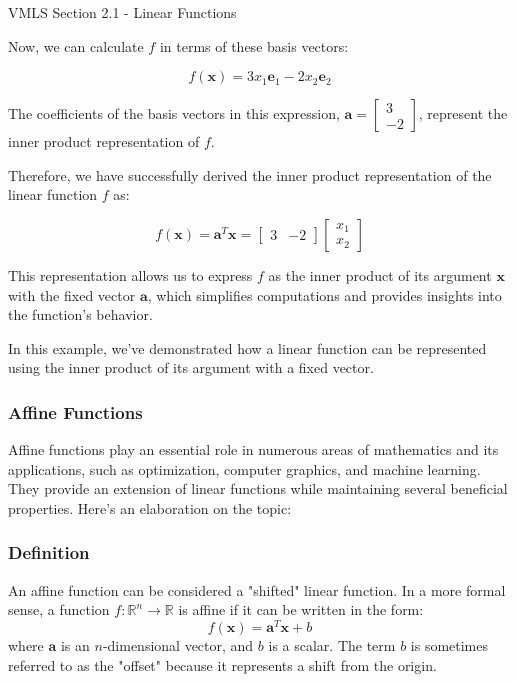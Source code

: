 \begin{notes}{VMLS Section 2.1 - Linear Functions}
\begin{highlight}
        Now, we can calculate \(f\) in terms of these basis vectors:
        
        \[
        f(\mathbf{x}) = 3x_1\mathbf{e}_1 - 2x_2\mathbf{e}_2
        \]
        
        The coefficients of the basis vectors in this expression, \(\mathbf{a} = \begin{bmatrix} 3 \\ -2 \end{bmatrix}\), represent the inner product representation of \(f\).
        
        Therefore, we have successfully derived the inner product representation of the linear function \(f\) as:
        
        \[
        f(\mathbf{x}) = \mathbf{a}^T \mathbf{x} = \begin{bmatrix} 3 & -2 \end{bmatrix} \begin{bmatrix} x_1 \\ x_2 \end{bmatrix}
        \]

        
        This representation allows us to express \(f\) as the inner product of its argument \(\mathbf{x}\) with the fixed vector \(\mathbf{a}\), which simplifies computations and provides insights into the function's behavior.
        
        In this example, we've demonstrated how a linear function can be represented using the inner product of its argument with a fixed vector.
    \end{highlight}
    
    \subsubsection*{Affine Functions}
    
    Affine functions play an essential role in numerous areas of mathematics and its applications, such as optimization, computer graphics, and machine learning. They provide an extension of linear functions while maintaining several 
    beneficial properties. Here's an elaboration on the topic:
    
    \subsubsection*{Definition}
    An affine function can be considered a "shifted" linear function. In a more formal sense, a function \( f: \mathbb{R}^n \rightarrow \mathbb{R} \) is affine if it can be written in the form:
    \[ f(\mathbf{x}) = \mathbf{a}^T \mathbf{x} + b \]
    where \( \mathbf{a} \) is an \( n \)-dimensional vector, and \( b \) is a scalar. The term \( b \) is sometimes referred to as the "offset" because it represents a shift from the origin.
    

\end{notes}
